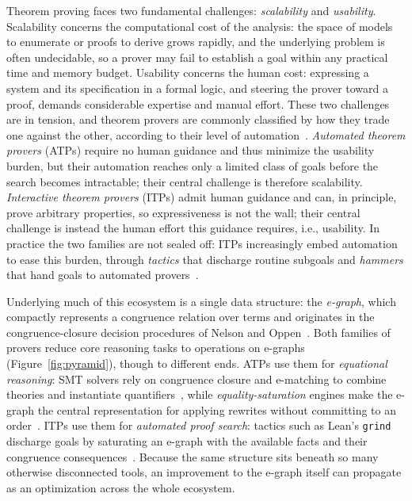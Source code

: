 Theorem proving faces two fundamental challenges: \textit{scalability} and
\textit{usability}. Scalability concerns the computational cost of the analysis:
the space of models to enumerate or proofs to derive grows rapidly, and the
underlying problem is often undecidable, so a prover may fail to establish a
goal within any practical time
and memory budget. Usability concerns the human cost: expressing a system and
its specification in a formal logic, and steering the prover toward a proof,
demands considerable expertise and manual effort. These two challenges are in
tension, and theorem provers are commonly classified by how they trade one
against the other, according to their level of automation~\cite{harrison2014history, wiedijk2006seventeen}. \textit{Automated
theorem provers} (ATPs) require no human guidance and thus minimize the
usability burden, but their automation reaches only a limited class of goals
before the search becomes intractable; their central challenge is therefore
scalability. \textit{Interactive theorem provers} (ITPs) admit human guidance
and can, in principle, prove arbitrary properties, so expressiveness is not the
wall; their central challenge is instead the human effort this guidance
requires, i.e., usability. In practice the two families are not sealed off: ITPs
increasingly embed automation to ease this burden, through \textit{tactics} that
discharge routine subgoals and \textit{hammers} that hand goals to automated
provers~\cite{blanchette2016hammering}.

Underlying much of this ecosystem is a single data structure: the
\textit{e-graph}, which compactly represents a congruence relation over terms
and originates in the congruence-closure decision procedures of Nelson and
Oppen~\cite{nelson1980congruence}. Both families of provers reduce core
reasoning tasks to operations on e-graphs (Figure~\ref{fig:pyramid}), though to
different ends. ATPs use
them for \textit{equational reasoning}: SMT solvers rely on congruence closure
and e-matching to combine theories and instantiate
quantifiers~\cite{demoura2007ematching, demoura2008z3}, while
\textit{equality-saturation}
engines make the e-graph the central representation for applying rewrites
without committing to an order~\cite{tate2009eqsat, willsey2021egg}. ITPs use
them for \textit{automated proof search}: tactics such as Lean's
\texttt{grind} discharge goals by saturating an e-graph with the available facts
and their congruence consequences~\cite{leangrind}. Because the same
structure sits beneath so many otherwise disconnected tools, an improvement to
the e-graph itself can propagate as an optimization across the whole ecosystem.

